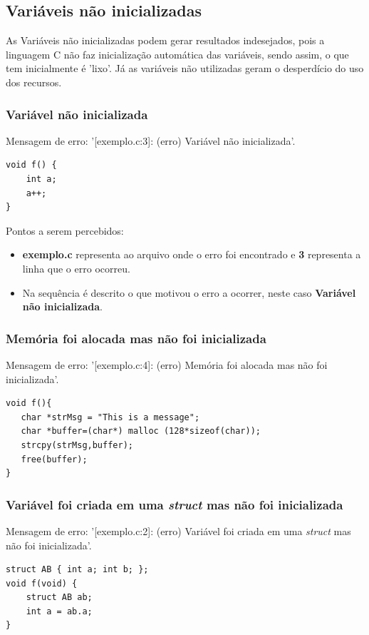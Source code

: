 \documentclass[12pt,a4paper]{report}
\begin{document}
\subsection{Variáveis não inicializadas}
As Variáveis não inicializadas podem gerar resultados indesejados, pois a linguagem C não faz inicialização automática das variáveis, sendo assim, o que tem inicialmente é 'lixo'.
Já as variáveis não utilizadas geram o desperdício do uso dos recursos.
\subsubsection{Variável não inicializada}
Mensagem de erro: '[exemplo.c:3]: (erro) Variável não inicializada'.
\begin{lstlisting}[style=CStyle]
void f() {
    int a;
    a++;
}
\end{lstlisting}
Pontos a serem percebidos:
\begin{itemize}
    \item \textbf{exemplo.c} representa ao arquivo onde o erro foi encontrado e \textbf{3} representa a linha que o erro ocorreu.
    \item Na sequência é descrito o que motivou o erro a ocorrer, neste caso \textbf{Variável não inicializada}.
\end{itemize}


\subsubsection{Memória foi alocada mas não foi inicializada}
Mensagem de erro: '[exemplo.c:4]: (erro) Memória foi alocada mas não foi inicializada'.
\begin{lstlisting}[style=CStyle]
void f(){
   char *strMsg = "This is a message";
   char *buffer=(char*) malloc (128*sizeof(char));
   strcpy(strMsg,buffer);
   free(buffer);
}
\end{lstlisting}

\subsubsection{Variável foi criada em uma \textit{struct} mas não foi inicializada}
Mensagem de erro: '[exemplo.c:2]: (erro) Variável foi criada em uma \textit{struct} mas não foi inicializada'.
\begin{lstlisting}[style=CStyle]
struct AB { int a; int b; };
void f(void) {
    struct AB ab;
    int a = ab.a;
}
\end{lstlisting}
\end{document}
